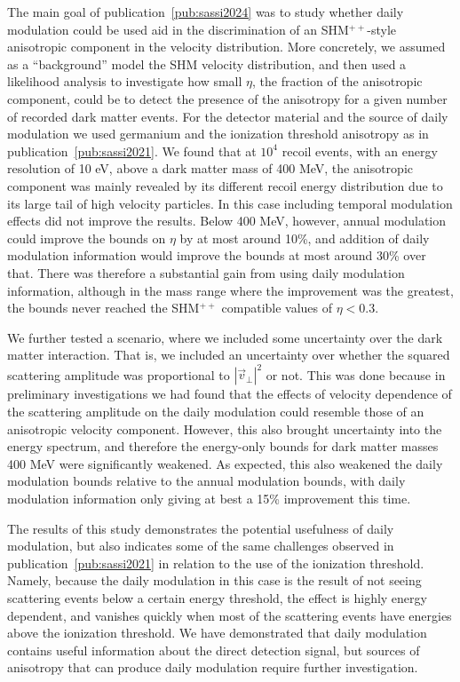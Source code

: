 The main goal of publication~\ref{pub:sassi2024} was to study whether daily modulation could be used aid in the discrimination of an SHM$^{++}$-style anisotropic component in the velocity distribution. More concretely, we assumed as a ``background'' model the SHM velocity distribution, and then used a likelihood analysis to investigate how small $\eta$, the fraction of the anisotropic component, could be to detect the presence of the anisotropy for a given number of recorded dark matter events. For the detector material and the source of daily modulation we used germanium and the ionization threshold anisotropy as in publication~\ref{pub:sassi2021}. We found that at $10^4$ recoil events, with an energy resolution of 10 eV, above a dark matter mass of 400 MeV, the anisotropic component was mainly revealed by its different recoil energy distribution due to its large tail of high velocity particles. In this case including temporal modulation effects did not improve the results. Below 400 MeV, however, annual modulation could improve the bounds on $\eta$ by at most around 10\%, and addition of daily modulation information would improve the bounds at most around 30\% over that. There was therefore a substantial gain from using daily modulation information, although in the mass range where the improvement was the greatest, the bounds never reached the SHM$^{++}$ compatible values of $\eta<0.3$.

We further tested a scenario, where we included some uncertainty over the dark matter interaction. That is, we included an uncertainty over whether the squared scattering amplitude was proportional to $|\vec{v}_\perp|^2$ or not. This was done because in preliminary investigations we had found that the effects of velocity dependence of the scattering amplitude on the daily modulation could resemble those of an anisotropic velocity component. However, this also brought uncertainty into the energy spectrum, and therefore the energy-only bounds for dark matter masses 400 MeV were significantly weakened. As expected, this also weakened the daily modulation bounds relative to the annual modulation bounds, with daily modulation information only giving at best a 15\% improvement this time.

The results of this study demonstrates the potential usefulness of daily modulation, but also indicates some of the same challenges observed in publication~\ref{pub:sassi2021} in relation to the use of the ionization threshold. Namely, because the daily modulation in this case is the result of not seeing scattering events below a certain energy threshold, the effect is highly energy dependent, and vanishes quickly when most of the scattering events have energies above the ionization threshold. We have demonstrated that daily modulation contains useful information about the direct detection signal, but sources of anisotropy that can produce daily modulation require further investigation.


